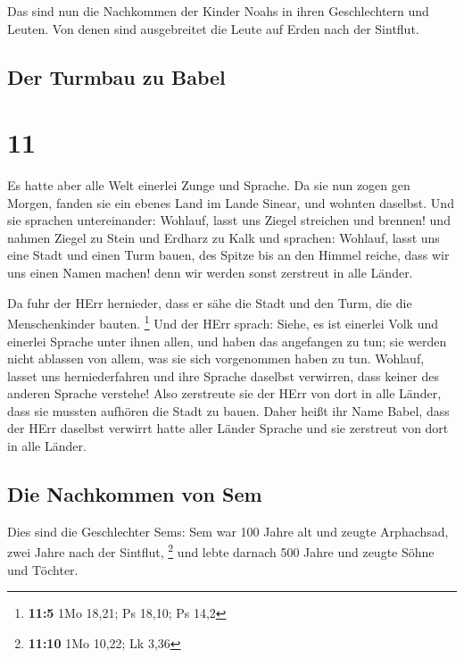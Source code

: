 Das sind nun die Nachkommen der Kinder Noahs in ihren
Geschlechtern und Leuten. Von denen sind ausgebreitet die Leute auf
Erden nach der Sintflut.

\hypertarget{der-turmbau-zu-babel}{%
\subsection{Der Turmbau zu Babel}\label{der-turmbau-zu-babel}}

\hypertarget{section-10}{%
\section{11}\label{section-10}}

 Es hatte aber alle Welt einerlei Zunge und Sprache.
 Da sie nun zogen gen Morgen, fanden sie ein ebenes Land
im Lande Sinear, und wohnten daselbst.  Und sie sprachen
untereinander: Wohlauf, lasst uns Ziegel streichen und brennen! und
nahmen Ziegel zu Stein und Erdharz zu Kalk  und sprachen:
Wohlauf, lasst uns eine Stadt und einen Turm bauen, des Spitze bis an
den Himmel reiche, dass wir uns einen Namen machen! denn wir werden
sonst zerstreut in alle Länder.

 Da fuhr der HErr hernieder, dass er sähe die Stadt und
den Turm, die die Menschenkinder bauten. \footnote{\textbf{11:5} 1Mo
  18,21; Ps 18,10; Ps 14,2}  Und der HErr sprach: Siehe,
es ist einerlei Volk und einerlei Sprache unter ihnen allen, und haben
das angefangen zu tun; sie werden nicht ablassen von allem, was sie sich
vorgenommen haben zu tun.  Wohlauf, lasset uns
herniederfahren und ihre Sprache daselbst verwirren, dass keiner des
anderen Sprache verstehe!  Also zerstreute sie der HErr
von dort in alle Länder, dass sie mussten aufhören die Stadt zu bauen.
 Daher heißt ihr Name Babel, dass der HErr daselbst
verwirrt hatte aller Länder Sprache und sie zerstreut von dort in alle
Länder.

\hypertarget{die-nachkommen-von-sem}{%
\subsection{Die Nachkommen von Sem}\label{die-nachkommen-von-sem}}

 Dies sind die Geschlechter Sems: Sem war 100 Jahre alt
und zeugte Arphachsad, zwei Jahre nach der Sintflut, \footnote{\textbf{11:10}
  1Mo 10,22; Lk 3,36}  und lebte darnach 500 Jahre und
zeugte Söhne und Töchter.

